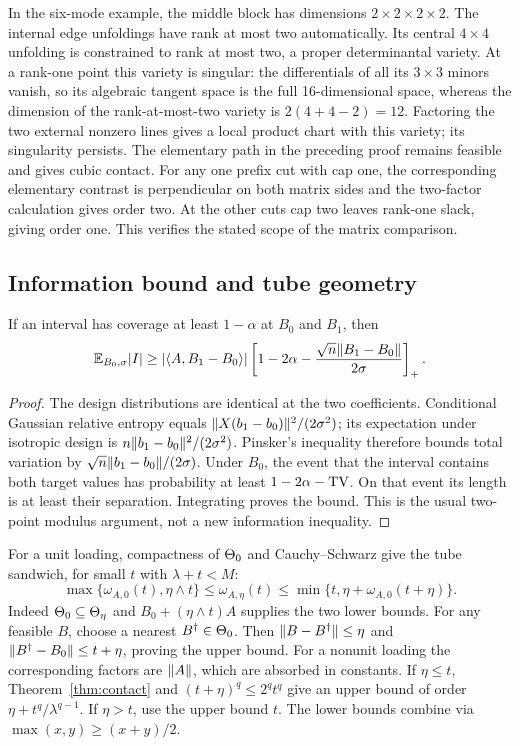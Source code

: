 In the six-mode example, the middle block has dimensions $2\times2\times2\times2$. The internal edge unfoldings have rank at most two automatically. Its central $4\times4$ unfolding is constrained to rank at most two, a proper determinantal variety. At a rank-one point this variety is singular: the differentials of all its $3\times3$ minors vanish, so its algebraic tangent space is the full 16-dimensional space, whereas the dimension of the rank-at-most-two variety is $2(4+4-2)=12$. Factoring the two external nonzero lines gives a local product chart with this variety; its singularity persists. The elementary path in the preceding proof remains feasible and gives cubic contact. For any one prefix cut with cap one, the corresponding elementary contrast is perpendicular on both matrix sides and the two-factor calculation gives order two. At the other cuts cap two leaves rank-one slack, giving order one. This verifies the stated scope of the matrix comparison.

\subsection{Information bound and tube geometry}
\begin{lemma}\label{lem:twopoint}
If an interval has coverage at least $1-\alpha$ at $B_0$ and $B_1$, then
\[
 \mathbb E_{B_0,\sigma}|I|\ge|\langle A,B_1-B_0\rangle|
 \left[1-2\alpha-\frac{\sqrt n\lVert B_1-B_0\rVert}{2\sigma}\right]_+.
\]
\end{lemma}
\begin{proof}
The design distributions are identical at the two coefficients. Conditional Gaussian relative entropy equals $\lVert X(b_1-b_0)\rVert^2/(2\sigma^2)$; its expectation under isotropic design is $n\lVert b_1-b_0\rVert^2/(2\sigma^2)$. Pinsker's inequality therefore bounds total variation by $\sqrt n\lVert b_1-b_0\rVert/(2\sigma)$. Under $B_0$, the event that the interval contains both target values has probability at least $1-2\alpha-\operatorname{TV}$. On that event its length is at least their separation. Integrating proves the bound. This is the usual two-point modulus argument, not a new information inequality.
\end{proof}

For a unit loading, compactness of $\Theta_0$ and Cauchy--Schwarz give the tube sandwich, for small $t$ with $\lambda+t<M$:
\begin{equation}\label{eq:tubesandwich}
 \max\{\omega_{A,0}(t),\eta\wedge t\}
 \le\omega_{A,\eta}(t)
 \le\min\{t,\eta+\omega_{A,0}(t+\eta)\}.
\end{equation}
Indeed $\Theta_0\subseteq\Theta_\eta$ and $B_0+(\eta\wedge t)A$ supplies the two lower bounds. For any feasible $B$, choose a nearest $B^\dagger\in\Theta_0$. Then $\lVert B-B^\dagger\rVert\le\eta$ and $\lVert B^\dagger-B_0\rVert\le t+\eta$, proving the upper bound. For a nonunit loading the corresponding factors are $\lVert A\rVert$, which are absorbed in constants. If $\eta\le t$, Theorem~\ref{thm:contact} and $(t+\eta)^q\le2^qt^q$ give an upper bound of order $\eta+t^q/\lambda^{q-1}$. If $\eta>t$, use the upper bound $t$. The lower bounds combine via $\max(x,y)\ge(x+y)/2$.

